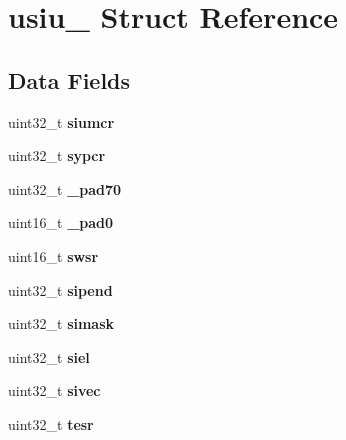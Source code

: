\hypertarget{structusiu__}{}\section{usiu\+\_\+ Struct Reference}
\label{structusiu__}
\subsection*{Data Fields}
\begin{DoxyCompactItemize}
\item 
\mbox{\label{structusiu___a523964193eac9f0220af0a583e6107c2}} 
uint32\+\_\+t {\bfseries siumcr}
\item 
\mbox{\label{structusiu___acfd5b961c4b617f7d05fe24912217b1d}} 
uint32\+\_\+t {\bfseries sypcr}
\item 
\mbox{\label{structusiu___adc830a5ef54416d13343884b532e5419}} 
uint32\+\_\+t {\bfseries \+\_\+pad70}
\item 
\mbox{\label{structusiu___a626589b4752c91d542af60042183e44e}} 
uint16\+\_\+t {\bfseries \+\_\+pad0}
\item 
\mbox{\label{structusiu___adab0ec5e1f1d08ac7c7a4ebf6265ea3a}} 
uint16\+\_\+t {\bfseries swsr}
\item 
\mbox{\label{structusiu___af543e94761ac5fadbadf6f7f2ee78b54}} 
uint32\+\_\+t {\bfseries sipend}
\item 
\mbox{\label{structusiu___a8faa39273d9de8bcd09b57bc3ea866dc}} 
uint32\+\_\+t {\bfseries simask}
\item 
\mbox{\label{structusiu___a7c61ba2db71fb4b2b70fdb5ca3f5a306}} 
uint32\+\_\+t {\bfseries siel}
\item 
\mbox{\label{structusiu___a929d95375eee46e6b7b69da6d30f2031}} 
uint32\+\_\+t {\bfseries sivec}
\item 
\mbox{\label{structusiu___a7cb95bf48e904df4921d433de2be4424}} 
uint32\+\_\+t {\bfseries tesr}
\item 

\end{DoxyCompactItemize}
